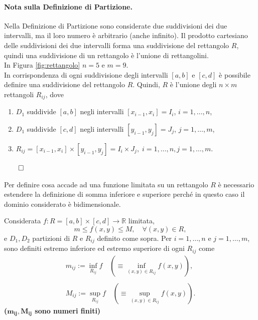 
\paragraph{Nota sulla Definizione di Partizione.} Nella Definizione di Partizione sono considerate due suddivisioni dei due intervalli, ma il loro numero è arbitrario (anche infinito). Il prodotto cartesiano delle suddivisioni dei due intervalli forma una suddivisione del rettangolo $R$, quindi una suddivisione di un rettangolo è l'unione di rettangolini.\\
In Figura \ref{fig:rettangolo} $n=5$ e $m=9$.\\
In corrispondenza di ogni suddivisione degli intervalli $[a,b]$ e $[c,d]$ è possibile definire una suddivisione del rettangolo $R$. Quindi, $R$ è l'unione degli $n\times m$ rettangoli $R_{ij}$, dove
\begin{enumerate}
	\item $D_1$ suddivide $[a,b]$ negli intervalli $[x_{i-1}, x_i]=I_i$, $i=1,\hdots, n$,
	\item $D_1$ suddivide $[c,d]$ negli intervalli $[y_{i-1}, y_j]=J_j$, $j=1,\hdots, m$,
	\item $R_{ij} = [x_{i-1}, x_i] \times [y_{i-1}, y_j] = I_i \times J_j, \; i=1,\hdots, n, j=1,\hdots, m$.
\end{enumerate} $\qed$

Per definire cosa accade ad una funzione limitata su un rettangolo $R$ è necessario estendere la definizione di somma inferiore e superiore perché in questo caso il dominio considerato è bidimensionale.

\begin{definition}
	Considerata $f:R = [a,b]\times[c,d]\rightarrow\mathbb{R}$ limitata,
	\begin{equation*}
		m\leq f(x,y)\leq M,\quad \forall(x,y)\in R,
	\end{equation*}
	e $D_1,D_2$ partizioni di $R$ e $R_{ij}$ definito come sopra. Per $i=1,\hdots, n$ e $j=1,\hdots, m$, sono definiti estremo inferiore ed estremo superiore di ogni $R_{ij}$ come
	\begin{equation}\label{eq:estremo_inf_sup}
		\begin{matrix}
			m_{ij} := \underset{R_{ij}}{\inf} f\quad\left(\equiv\underset{(x,y)\in R_{ij}}{\inf} f(x,y)\right),\\\\
			M_{ij} := \underset{R_{ij}}{\sup} f\quad\left(\equiv\underset{(x,y)\in R_{ij}}{\sup} f(x,y)\right).
		\end{matrix}
	\end{equation}
	\textbf{($\boldsymbol{m_{ij}, M_{ij}}$ sono numeri finiti)}
\end{definition}

